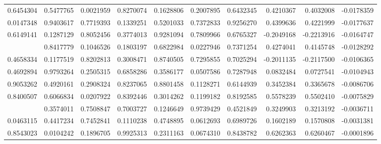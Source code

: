 \documentclass[
]{article}
\theoremstyle{plain}
\begin{document}
\begin{landscape}
\begin{longtable}[t]{rrrrrrrrrr}
0.6454304 & 0.5477765 & 0.0021959 & 0.8270074 & 0.1628806 & 0.2007895 & 0.6432345 & 0.4210367 & 0.4032008 & -0.0178359\\
0.0147348 & 0.9403617 & 0.7719393 & 0.1339251 & 0.5201033 & 0.7372833 & 0.9256270 & 0.4399636 & 0.4221999 & -0.0177637\\
0.6149141 & 0.1287129 & 0.8052456 & 0.3774013 & 0.9281094 & 0.7809966 & 0.6765327 & -0.2049168 & -0.2213916 & -0.0164747\\
\addlinespace
0.6318831 & 0.8417779 & 0.1046526 & 0.1803197 & 0.6822984 & 0.0227946 & 0.7371254 & 0.4274041 & 0.4145748 & -0.0128292\\
0.4658334 & 0.1177519 & 0.8202813 & 0.3008471 & 0.8740505 & 0.7295855 & 0.7025294 & -0.2011135 & -0.2117500 & -0.0106365\\
0.4692894 & 0.9793264 & 0.2505315 & 0.6858286 & 0.3586177 & 0.0507586 & 0.7287948 & 0.0832484 & 0.0727541 & -0.0104943\\
0.9053262 & 0.4920161 & 0.2908324 & 0.8237065 & 0.8801458 & 0.1128271 & 0.6144939 & 0.3452384 & 0.3365678 & -0.0086706\\
0.8400507 & 0.6066834 & 0.0207922 & 0.8392446 & 0.3014262 & 0.1199182 & 0.8192585 & 0.5578239 & 0.5502410 & -0.0075829\\
\addlinespace
0.2986999 & 0.3574011 & 0.7508847 & 0.7003727 & 0.1246649 & 0.9739429 & 0.4521849 & 0.3249903 & 0.3213192 & -0.0036711\\
0.0463115 & 0.4417234 & 0.7452841 & 0.1110238 & 0.4748895 & 0.0612693 & 0.6989726 & 0.1602189 & 0.1570808 & -0.0031381\\
0.8543023 & 0.0104242 & 0.1896705 & 0.9925313 & 0.2311163 & 0.0674310 & 0.8438782 & 0.6262363 & 0.6260467 & -0.0001896\\*
\end{longtable}
\end{landscape}
\endgroup{}
\end{document}
